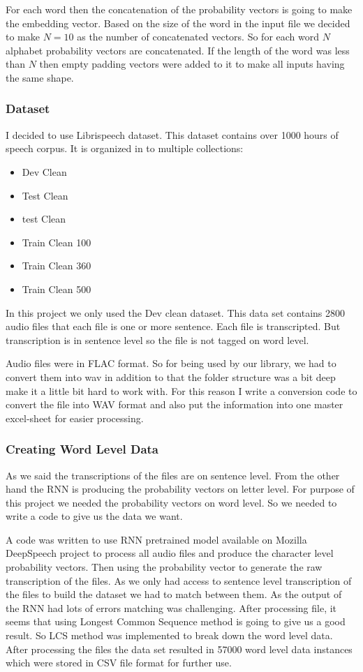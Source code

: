 For each word then the concatenation of the probability vectors is going to make the embedding vector. Based on the size of the word in the input file we decided to make $N=10$ as the number of concatenated vectors. So for each word $N$ alphabet probability vectors are concatenated. If the length of the word was less than $N$ then empty padding vectors were added to it to make all inputs having the same shape.  

\subsubsection{Dataset}
I decided to use Librispeech dataset. This dataset contains over 1000 hours of speech corpus. It is organized in to multiple collections: 
\begin{itemize}
    \item Dev Clean 
    \item Test Clean 
    \item test Clean 
    \item Train Clean 100
    \item Train Clean 360
    \item Train Clean 500
\end{itemize}

In this project we only used the Dev clean dataset. This data set contains 2800 audio files that  each file is one or more sentence. Each file is transcripted. But transcription is in sentence level so the file is not tagged on word level. 

Audio files were in FLAC format. So for being used by our library, we had to convert them into wav in addition to that the folder structure was a bit deep make it a little bit hard to work with. For this reason I write a conversion code to convert the file into WAV format and also put the information into one master excel-sheet for easier processing. 

\subsubsection{Creating Word Level Data}
As we said the transcriptions of the files are on sentence level. From the other hand the RNN is producing the probability vectors on letter level.  For purpose of this project we needed the  probability vectors on word level. So we needed to write a code to give us the data we want. 

A code was written to use RNN pretrained model available on Mozilla DeepSpeech project to process all audio files and produce the character level probability vectors. Then using the probability vector to generate the raw transcription of the files. 
As we only had access to sentence level transcription of the files to build the dataset we had to match between them. As the output of the RNN had lots of errors matching was challenging. After processing file, it seems that using Longest Common Sequence method is going to give us a good result. So LCS method was implemented to break down the word level data. 
After processing the files the data set resulted in 57000 word level data instances which were stored in CSV file format for further use. 

